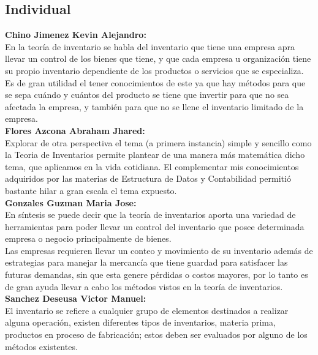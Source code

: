 \documentclass[letterpaper, 12pt]{article}
\begin{document}
    \subsection*{Individual}
    \justify
    \textbf{Chino Jimenez Kevin Alejandro: }
    \\
    En la teoría de inventario se habla del inventario que tiene una empresa apra llevar un control de los bienes que tiene, y que cada empresa u organización tiene su propio inventario dependiente de los productos o servicios que se especializa.
    \\\newline
    Es de gran utilidad el tener conocimientos de este ya que hay métodos para que se sepa cuándo y cuántos del producto se tiene que invertir para que no sea afectada la empresa, y también para que no se llene el inventario limitado de la empresa.
    \\\newline
    \textbf{Flores Azcona Abraham Jhared: }
    \\
    Explorar de otra perspectiva el tema (a primera instancia) simple y sencillo como la Teoria de Inventarios permite plantear de una manera más matemática dicho tema, que aplicamos en la vida cotidiana. El complementar mis conocimientos adquiridos por las materias de Estructura de Datos y Contabilidad permitió bastante hilar a gran escala el tema expuesto. 
    \\\newline
    \textbf{Gonzales Guzman Maria Jose: }
    \\
    En síntesis se puede decir que la teoría de inventarios aporta una variedad de herramientas para poder llevar un control del inventario que posee determinada empresa o negocio principalmente de bienes.\\
    Las empresas requieren llevar un conteo y movimiento de su inventario además de estrategias para manejar la mercancía que tiene guardad para satisfacer las futuras demandas, sin que esta genere pérdidas o costos mayores, por lo tanto es de gran ayuda
    llevar a cabo los métodos vistos en la teoría de inventarios.
    \\
    \textbf{Sanchez Deseusa Victor Manuel: }
    \\
    El inventario se refiere a cualquier grupo de elementos destinados a realizar alguna operación, existen diferentes tipos de inventarios, materia prima, productos en proceso de fabricación; estos deben ser evaluados por alguno de los métodos existentes.
    \\\newline
\end{document}
